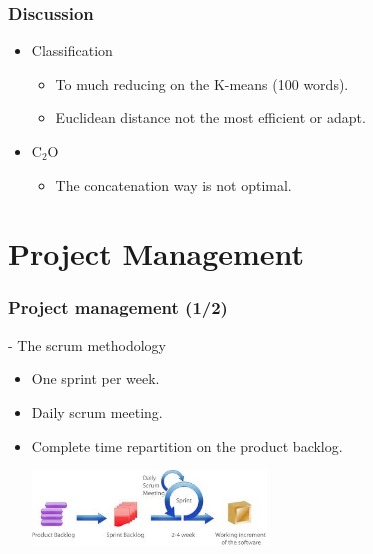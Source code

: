 \documentclass[xcolor=table]{beamer}
\begin{document}

\begin{frame} \frametitle{Discussion}

\begin{itemize}
    \item Classification
    \vspace{0.3cm}
    \begin{itemize}
        \item To much reducing on the K-means (100 words).
        \vspace{0.15cm}
        \item Euclidean distance not the most efficient or adapt.
    \end{itemize}
    \vspace{0.7cm}
    \item C$_2$O
    \vspace{0.3cm}
    \begin{itemize}
        \item The concatenation way is not optimal.
    \end{itemize}
\end{itemize}
\end{frame}

\section{Project Management}
\begin{frame}\frametitle{Project management (1/2)}

- The scrum methodology

\begin{itemize}
\item One sprint per week.
\item Daily scrum meeting.
\item Complete time repartition on the product backlog.

\includegraphics[height=2cm]{scrum.jpg}
\end{itemize}

\end{frame}
\end{document}
